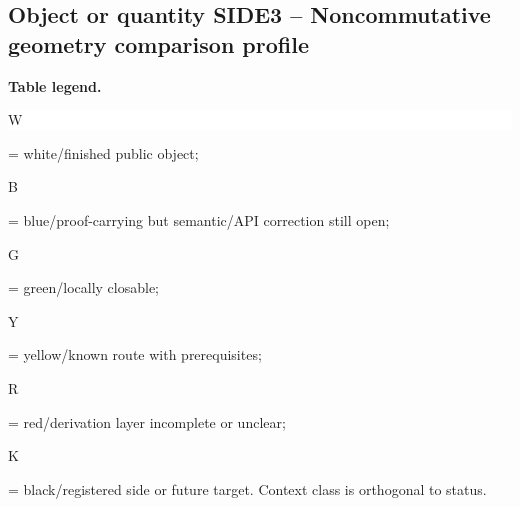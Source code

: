 \subsection*{Object or quantity SIDE3 -- Noncommutative geometry comparison profile}
\hypertarget{objproof:SIDE3}{}
\par\smallskip\noindent\begin{minipage}{0.99\linewidth}\footnotesize\raggedright\textbf{Table legend.} \colorbox{white}{\strut W} = white/finished public object; \colorbox{cyan!20}{\strut B} = blue/proof-carrying but semantic/API correction still open; \colorbox{green!18}{\strut G} = green/locally closable; \colorbox{yellow!25}{\strut Y} = yellow/known route with prerequisites; \colorbox{red!20}{\strut R} = red/derivation layer incomplete or unclear; \colorbox{black!18}{\strut K} = black/registered side or future target. Context class is orthogonal to status.\end{minipage}\par\vspace{0.25em}
